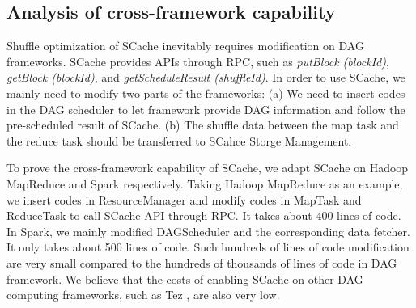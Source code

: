 {\color{blue}
\subsection{Analysis of cross-framework capability}\label{crossframework}
Shuffle optimization of SCache inevitably requires modification on DAG frameworks. SCache provides APIs through RPC, such as \textit{putBlock (blockId)}, \textit{getBlock (blockId)}, and \textit{getScheduleResult (shuffleId)}. In order to use SCache, we mainly need to modify two parts of the frameworks: (a) We need to insert codes in the DAG scheduler to let framework provide DAG information and follow the pre-scheduled result of SCache. (b) The shuffle data between the map task and the reduce task should be transferred to SCahce Storge Management.

To prove the cross-framework capability of SCache, we adapt SCache on Hadoop MapReduce and Spark respectively. Taking Hadoop MapReduce as an example, we insert codes in ResourceManager and modify codes in MapTask and ReduceTask to call SCache API through RPC. It takes about 400 lines of code. In Spark, we mainly modified DAGScheduler and the corresponding data fetcher. 
It only takes about 500 lines of code. Such hundreds of lines of code modification are very small compared to the hundreds of thousands of lines of code in DAG framework. We believe that the costs of enabling SCache on other DAG computing frameworks, such as Tez \cite{tez}, are also very low.
}

